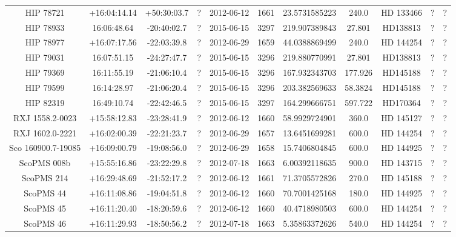 \begin{table}
\begin{tabular}{ccccccccccc}
HIP 78721 & +16:04:14.14 & +50:30:03.7 & ? & 2012-06-12 & 1661 & 23.5731585223 & 240.0 & HD 133466 & ? & ? \\
HIP 78933 & 16:06:48.64 & -20:40:02.7 & ? & 2015-06-15 & 3297 & 219.907389843 & 27.801 & HD138813 & ? & ? \\
HIP 78977 & +16:07:17.56 & -22:03:39.8 & ? & 2012-06-29 & 1659 & 44.0388869499 & 240.0 & HD 144254 & ? & ? \\
HIP 79031 & 16:07:51.15 & -24:27:47.7 & ? & 2015-06-15 & 3296 & 219.880770991 & 27.801 & HD138813 & ? & ? \\
HIP 79369 & 16:11:55.19 & -21:06:10.4 & ? & 2015-06-15 & 3296 & 167.932343703 & 177.926 & HD145188 & ? & ? \\
HIP 79599 & 16:14:28.97 & -21:06:20.4 & ? & 2015-06-15 & 3296 & 203.382569633 & 58.3824 & HD145188 & ? & ? \\
HIP 82319 & 16:49:10.74 & -22:42:46.5 & ? & 2015-06-15 & 3297 & 164.299666751 & 597.722 & HD170364 & ? & ? \\
RXJ 1558.2-0023 & +15:58:12.83 & -23:28:41.9 & ? & 2012-06-12 & 1660 & 58.9929724901 & 360.0 & HD 145127 & ? & ? \\
RXJ 1602.0-2221 & +16:02:00.39 & -22:21:23.7 & ? & 2012-06-29 & 1657 & 13.6451699281 & 600.0 & HD 144254 & ? & ? \\
Sco 160900.7-19085 & +16:09:00.79 & -19:08:56.0 & ? & 2012-06-29 & 1658 & 15.7406804845 & 600.0 & HD 144925 & ? & ? \\
ScoPMS 008b & +15:55:16.86 & -23:22:29.8 & ? & 2012-07-18 & 1663 & 6.00392118635 & 900.0 & HD 143715 & ? & ? \\
ScoPMS 214 & +16:29:48.69 & -21:52:17.2 & ? & 2012-06-12 & 1661 & 71.3705572826 & 270.0 & HD 145188 & ? & ? \\
ScoPMS 44 & +16:11:08.86 & -19:04:51.8 & ? & 2012-06-12 & 1660 & 70.7001425168 & 180.0 & HD 144925 & ? & ? \\
ScoPMS 45 & +16:11:20.40 & -18:20:59.6 & ? & 2012-06-12 & 1660 & 40.4718980503 & 600.0 & HD 144254 & ? & ? \\
ScoPMS 46 & +16:11:29.93 & -18:50:56.2 & ? & 2012-07-18 & 1663 & 5.35863372626 & 540.0 & HD 144254 & ? & ? \\
\end{tabular}
\end{table}

